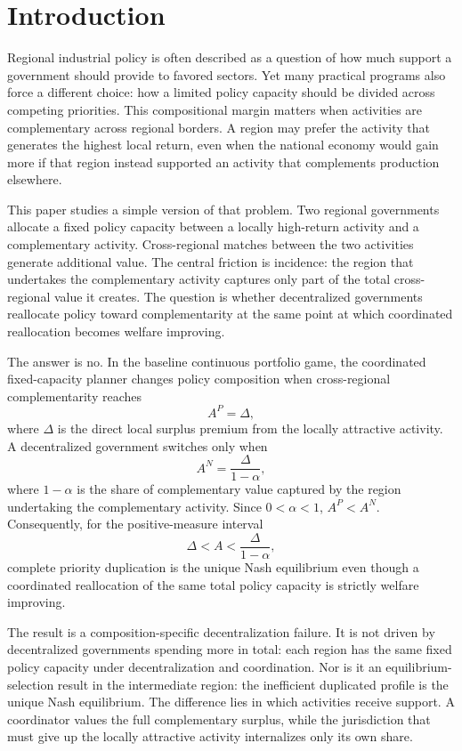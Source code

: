 \section{Introduction}
\label{sec:introduction}

Regional industrial policy is often described as a question of how much support a government should provide to favored sectors. Yet many practical programs also force a different choice: how a limited policy capacity should be divided across competing priorities. This compositional margin matters when activities are complementary across regional borders. A region may prefer the activity that generates the highest local return, even when the national economy would gain more if that region instead supported an activity that complements production elsewhere.

This paper studies a simple version of that problem. Two regional governments allocate a fixed policy capacity between a locally high-return activity and a complementary activity. Cross-regional matches between the two activities generate additional value. The central friction is incidence: the region that undertakes the complementary activity captures only part of the total cross-regional value it creates. The question is whether decentralized governments reallocate policy toward complementarity at the same point at which coordinated reallocation becomes welfare improving.

The answer is no. In the baseline continuous portfolio game, the coordinated fixed-capacity planner changes policy composition when cross-regional complementarity reaches
\[
A^P=\Delta,
\]
where $\Delta$ is the direct local surplus premium from the locally attractive activity. A decentralized government switches only when
\[
A^N=\frac{\Delta}{1-\alpha},
\]
where $1-\alpha$ is the share of complementary value captured by the region undertaking the complementary activity. Since $0<\alpha<1$, $A^P<A^N$. Consequently, for the positive-measure interval
\[
\Delta<A<\frac{\Delta}{1-\alpha},
\]
complete priority duplication is the unique Nash equilibrium even though a coordinated reallocation of the same total policy capacity is strictly welfare improving.

The result is a composition-specific decentralization failure. It is not driven by decentralized governments spending more in total: each region has the same fixed policy capacity under decentralization and coordination. Nor is it an equilibrium-selection result in the intermediate region: the inefficient duplicated profile is the unique Nash equilibrium. The difference lies in which activities receive support. A coordinator values the full complementary surplus, while the jurisdiction that must give up the locally attractive activity internalizes only its own share.

